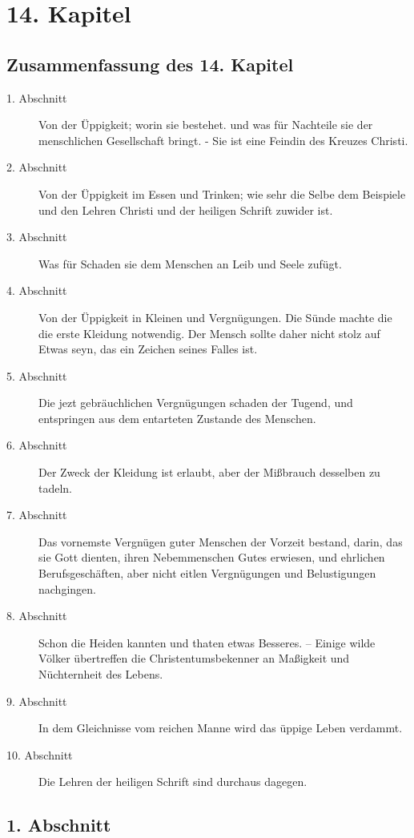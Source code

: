
\chapter{14. Kapitel} \label{kap14}

\section{Zusammenfassung des 14. Kapitel}
\small
\begin{description}
\item[1. Abschnitt] Von der Üppigkeit; worin sie bestehet. und was für Nachteile
sie der menschlichen Gesellschaft bringt. - Sie ist eine Feindin des Kreuzes
Christi.
\item[2. Abschnitt] Von der Üppigkeit im Essen und Trinken; wie sehr die Selbe
dem Beispiele und den Lehren Christi und der heiligen Schrift zuwider ist.
\item[3. Abschnitt] Was für Schaden sie dem Menschen an Leib und Seele zufügt.
\item[4. Abschnitt] Von der Üppigkeit in Kleinen und Vergnügungen. Die Sünde
machte die die erste Kleidung notwendig. Der Mensch sollte daher nicht stolz auf
Etwas seyn, das ein Zeichen seines Falles ist.
\item[5. Abschnitt] Die jezt gebräuchlichen Vergnügungen schaden der Tugend, und
entspringen aus dem entarteten Zustande des Menschen.
\item[6. Abschnitt] Der Zweck der Kleidung ist erlaubt, aber der Mißbrauch
desselben zu tadeln.
\item[7. Abschnitt] Das vornemste Vergnügen guter Menschen der Vorzeit bestand,
darin, das sie Gott dienten, ihren Nebemmenschen Gutes erwiesen, und ehrlichen
Berufsgeschäften, aber nicht eitlen Vergnügungen und Belustigungen nachgingen.
\item[8. Abschnitt] Schon die Heiden kannten und thaten etwas Besseres. --
Einige wilde Völker übertreffen die Christentumsbekenner an Maßigkeit und
Nüchternheit des Lebens.
\item[9. Abschnitt] In dem Gleichnisse vom reichen Manne wird das üppige Leben
verdammt.
\item[10. Abschnitt] Die Lehren der heiligen Schrift sind durchaus dagegen.
\end{description}
\normalsize

\section{1. Abschnitt}


